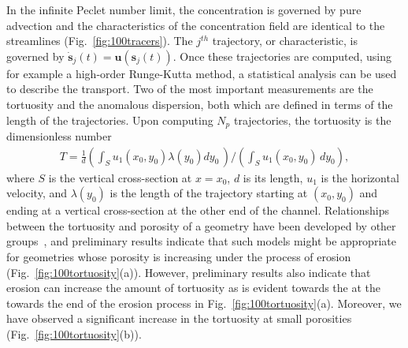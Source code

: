 \documentclass[11pt]{article}
\newcommand{\bvec}[1]{{\mathbf{#1}}}
\newcommand{\uu}{\bvec{u}}
\renewcommand{\ss}{{\mathbf{s}}}
\begin{document}
In the infinite Peclet number limit, the concentration is governed by pure advection and the characteristics of the concentration field are identical to the streamlines (Fig.~\ref{fig:100tracers}). The $j^{th}$ trajectory, or characteristic, is governed by $\dot{\ss}_j(t) = \uu(\ss_j(t))$. Once these trajectories are computed, using for example a high-order Runge-Kutta method, a statistical analysis can be used to describe the transport. Two of the most important measurements are the tortuosity and the anomalous dispersion, both which are defined in terms of the length of the trajectories. Upon computing $N_p$ trajectories, the tortuosity is the dimensionless number
\begin{align}
  T = \frac{1}{d} \left(\int_{S} u_1(x_0,y_0)\lambda(y_0) dy_0\, \right)
  \Bigg/ \left(\int_S u_1(x_0,y_0)\, dy_0 \right),
\end{align}
where $S$ is the vertical cross-section at $x=x_0$, $d$ is its length, $u_1$ is the horizontal velocity, and $\lambda(y_0)$ is the length of the trajectory starting at $(x_0,y_0)$ and ending at a vertical cross-section at the other end of the channel. Relationships between the tortuosity and porosity of a geometry have been developed by other groups~\cite{kop-kat-tim1996, dud-koz-mat2011, mat-kha-koz2008}, and preliminary results indicate that such models might be appropriate for geometries whose porosity is increasing under the process of erosion (Fig.~\ref{fig:100tortuosity}(a)). However, preliminary results also indicate that erosion can increase the amount of tortuosity as is evident towards the at the towards the end of the erosion process in Fig.~\ref{fig:100tortuosity}(a). Moreover, we have observed a significant increase in the tortuosity at small porosities (Fig.~\ref{fig:100tortuosity}(b)).
\end{document}

